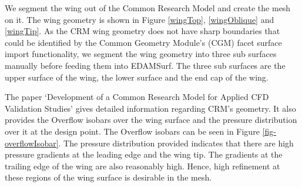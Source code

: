 We segment the wing out of the Common Research Model and create the mesh on it. The wing geometry is shown in Figure \ref{wingTop}, \ref{wingOblique} and \ref{wingTip}. As the CRM wing geometry does not have sharp boundaries that could be identified by the Common Geometry Module's (CGM) facet surface import functionality, we segment the wing geometry into three sub surfaces manually before feeding them into EDAMSurf. The three sub surfaces are the upper surface of the wing, the lower surface and the end cap of the wing. 

The paper `Development of a Common Research Model for Applied CFD Validation Studies'\cite{vassberg2008development} gives detailed information regarding CRM's geometry. It also provides the Overflow isobars over the wing surface and the pressure distribution over it at the design point. The Overflow isobars can be seen in Figure \ref{fig-overflowIsobar}. The pressure distribution provided indicates that there are high pressure gradients at the leading edge and the wing tip. The gradients at the trailing edge of the wing are also reasonably high. Hence, high refinement at these regions of the wing surface is desirable in the mesh.

